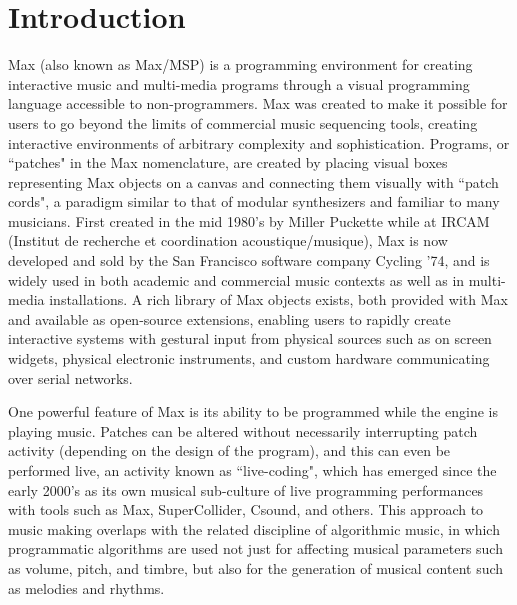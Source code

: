 \documentclass[acmsmall]{acmart}
\begin{document}

\maketitle

\section{Introduction}

Max (also known as Max/MSP) is a programming environment for creating interactive 
music and multi-media programs through a visual programming language accessible 
to non-programmers. Max was created to make it possible for users
to go beyond the limits of commercial music sequencing tools, creating
interactive environments of arbitrary complexity and sophistication.
\cite{Zicarelli2002}
Programs, or ``patches" in the Max nomenclature, are created by placing
visual boxes representing Max objects on a canvas and connecting them visually with
``patch cords", a paradigm similar to that of modular synthesizers and familiar to many musicians.
First created in the mid 1980's by Miller Puckette while at IRCAM 
(Institut de recherche et coordination acoustique/musique), 
Max is now developed and sold by the San Francisco software company Cycling '74,
and is widely used in both academic and commercial music contexts as well
as in multi-media installations. A rich library of Max objects exists, 
both provided with Max and available as open-source 
extensions, enabling users to rapidly create interactive systems with gestural 
input from physical sources such as on screen widgets, physical electronic instruments,
and custom hardware communicating over serial networks.


One powerful feature of Max is its ability to be programmed
while the engine is playing music. Patches can be altered 
without necessarily interrupting patch activity (depending on the design
of the program), and this can
even be performed live, an activity known as ``live-coding", which has
emerged since the early 2000's as its own musical sub-culture of 
live programming performances
with tools such as Max, SuperCollider, Csound, and others. 
\cite{Roberts18}
This approach to music making overlaps with the related discipline of 
algorithmic music, in which programmatic algorithms are used
not just for affecting musical parameters such as volume, pitch, and timbre, 
but also for the generation of musical content such as melodies
and rhythms.
\end{document}
